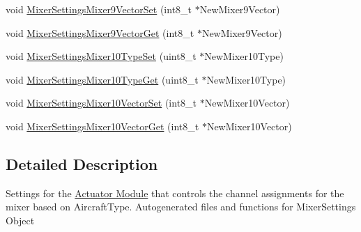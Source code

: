 \begin{DoxyCompactItemize}
\item 
void \hyperlink{group___mixer_settings_ga983d2382388d328ef912644a1ea0c147}{\-Mixer\-Settings\-Mixer9\-Vector\-Set} (int8\-\_\-t $\ast$\-New\-Mixer9\-Vector)
\item 
void \hyperlink{group___mixer_settings_ga1b0e6cdbaad4034ea1999fb970e27583}{\-Mixer\-Settings\-Mixer9\-Vector\-Get} (int8\-\_\-t $\ast$\-New\-Mixer9\-Vector)
\item 
void \hyperlink{group___mixer_settings_ga8fe9717e3538dacfb06bb67ba49bab71}{\-Mixer\-Settings\-Mixer10\-Type\-Set} (uint8\-\_\-t $\ast$\-New\-Mixer10\-Type)
\item 
void \hyperlink{group___mixer_settings_ga6a198738faf6cfb264e2fd4dd67ebc93}{\-Mixer\-Settings\-Mixer10\-Type\-Get} (uint8\-\_\-t $\ast$\-New\-Mixer10\-Type)
\item 
void \hyperlink{group___mixer_settings_ga1e83acabe312315ec2b8bdacb1d31d9a}{\-Mixer\-Settings\-Mixer10\-Vector\-Set} (int8\-\_\-t $\ast$\-New\-Mixer10\-Vector)
\item 
void \hyperlink{group___mixer_settings_gaec303efc3cfc00edaf75b3863abb70ba}{\-Mixer\-Settings\-Mixer10\-Vector\-Get} (int8\-\_\-t $\ast$\-New\-Mixer10\-Vector)
\end{DoxyCompactItemize}


\subsection{\-Detailed \-Description}
\-Settings for the \hyperlink{group___actuator_module}{\-Actuator \-Module} that controls the channel assignments for the mixer based on \-Aircraft\-Type. \-Autogenerated files and functions for \-Mixer\-Settings \-Object 

